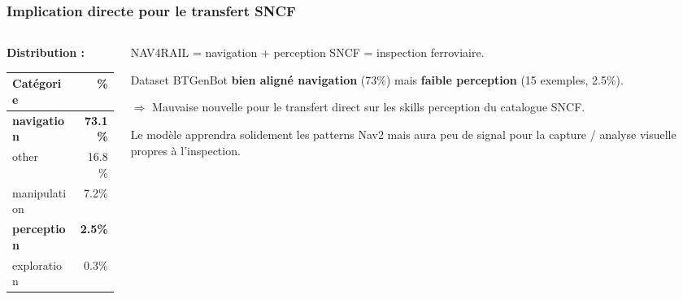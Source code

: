 \documentclass[aspectratio=169]{beamer}
\begin{document}
\begin{frame}
  \frametitle{Implication directe pour le transfert SNCF}

  \begin{columns}[T]
    \begin{column}{0.45\textwidth}
      \textbf{Distribution :}

      \vspace{0.3em}
      {\small\begin{tabular}{lr}
        \toprule
        Catégorie & \% \\
        \midrule
        \textbf{navigation} & \textbf{73.1\%} \\
        other & 16.8\% \\
        manipulation & 7.2\% \\
        \textbf{perception} & \textbf{2.5\%} \\
        exploration & 0.3\% \\
        \bottomrule
      \end{tabular}}
    \end{column}
    \begin{column}{0.52\textwidth}
      \begin{alertblock}{NAV4RAIL = navigation + perception}
        \small SNCF = inspection ferroviaire.

        \vspace{0.3em}
        Dataset BTGenBot \textbf{bien aligné navigation} (73\%) mais \textbf{faible perception} (15 exemples, 2.5\%).

        \vspace{0.3em}
        $\Rightarrow$ Mauvaise nouvelle pour le transfert direct sur les skills perception du catalogue SNCF.
      \end{alertblock}

      \vspace{0.3em}
      {\scriptsize Le modèle apprendra solidement les patterns Nav2 mais aura peu de signal pour la capture / analyse visuelle propres à l'inspection.}
    \end{column}
  \end{columns}
\end{frame}
\end{document}
